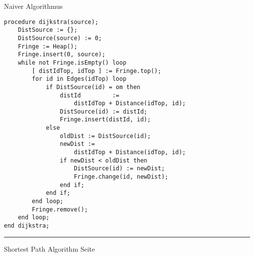 \begin{slide}{}
\normalsize

\begin{center}
Naiver Algorithmus
\end{center}
\vspace*{0.5cm}

\footnotesize
\begin{verbatim}
procedure dijkstra(source);
    DistSource := {};
    DistSource(source) := 0;
    Fringe := Heap();
    Fringe.insert(0, source);
    while not Fringe.isEmpty() loop
        [ distIdTop, idTop ] := Fringe.top();
        for id in Edges(idTop) loop
            if DistSource(id) = om then
                distId         := 
                    distIdTop + Distance(idTop, id);
                DistSource(id) := distId;
                Fringe.insert(distId, id); 
            else
                oldDist := DistSource(id);
                newDist := 
                    distIdTop + Distance(idTop, id);
                if newDist < oldDist then
                    DistSource(id) := newDist;
                    Fringe.change(id, newDist);
                end if;
            end if;
        end loop;
        Fringe.remove();
    end loop;
end dijkstra;
\end{verbatim}

\vspace*{\fill}
\tiny \addtocounter{mypage}{1}
\rule{17cm}{1mm}
Shortest Path Algorithm  \hspace*{\fill} Seite 
\end{slide}


